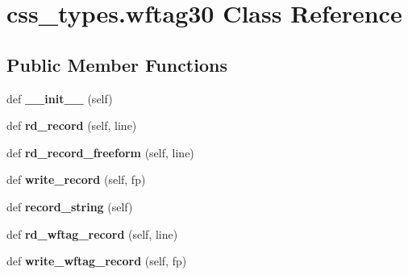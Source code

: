\hypertarget{classcss__types_1_1wftag30}{}\section{css\+\_\+types.\+wftag30 Class Reference}
\label{classcss__types_1_1wftag30}
\subsection*{Public Member Functions}
\begin{DoxyCompactItemize}
\item 
\hypertarget{classcss__types_1_1wftag30_aee1081146804d3129544a09c1f1829b0}{}def {\bfseries \+\_\+\+\_\+init\+\_\+\+\_\+} (self)\label{classcss__types_1_1wftag30_aee1081146804d3129544a09c1f1829b0}

\item 
\hypertarget{classcss__types_1_1wftag30_a51e2dad5b9e14aa0862bac47cfb232d4}{}def {\bfseries rd\+\_\+record} (self, line)\label{classcss__types_1_1wftag30_a51e2dad5b9e14aa0862bac47cfb232d4}

\item 
\hypertarget{classcss__types_1_1wftag30_a34d3220a10cd99a85874b43b4d03c403}{}def {\bfseries rd\+\_\+record\+\_\+freeform} (self, line)\label{classcss__types_1_1wftag30_a34d3220a10cd99a85874b43b4d03c403}

\item 
\hypertarget{classcss__types_1_1wftag30_a1c03e08d30f6255158d924c09dca2cc6}{}def {\bfseries write\+\_\+record} (self, fp)\label{classcss__types_1_1wftag30_a1c03e08d30f6255158d924c09dca2cc6}

\item 
\hypertarget{classcss__types_1_1wftag30_a332d9d5cc1cdbed8317c2e841965c627}{}def {\bfseries record\+\_\+string} (self)\label{classcss__types_1_1wftag30_a332d9d5cc1cdbed8317c2e841965c627}

\item 
\hypertarget{classcss__types_1_1wftag30_a87552c629efbbbd55bcaf765a8478be6}{}def {\bfseries rd\+\_\+wftag\+\_\+record} (self, line)\label{classcss__types_1_1wftag30_a87552c629efbbbd55bcaf765a8478be6}

\item 
\hypertarget{classcss__types_1_1wftag30_ac6da7ca77a734a60d30b399b97398722}{}def {\bfseries write\+\_\+wftag\+\_\+record} (self, fp)\label{classcss__types_1_1wftag30_ac6da7ca77a734a60d30b399b97398722}

\end{DoxyCompactItemize}
